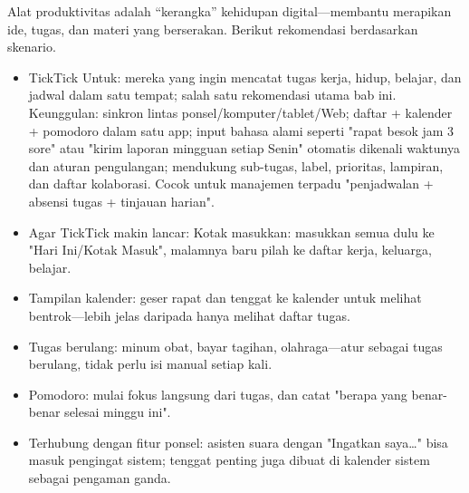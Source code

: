 


Alat produktivitas adalah “kerangka” kehidupan digital—membantu merapikan ide, tugas, dan materi yang berserakan. Berikut rekomendasi berdasarkan skenario.


\begin{itemize}
  \item TickTick Untuk: mereka yang ingin mencatat tugas kerja, hidup, belajar, dan jadwal dalam satu tempat; salah satu rekomendasi utama bab ini. Keunggulan: sinkron lintas ponsel/komputer/tablet/Web; daftar + kalender + pomodoro dalam satu app; input bahasa alami seperti "rapat besok jam 3 sore" atau "kirim laporan mingguan setiap Senin" otomatis dikenali waktunya dan aturan pengulangan; mendukung sub-tugas, label, prioritas, lampiran, dan daftar kolaborasi. Cocok untuk manajemen terpadu "penjadwalan + absensi tugas + tinjauan harian".
  \item Agar TickTick makin lancar: Kotak masukkan: masukkan semua dulu ke "Hari Ini/Kotak Masuk", malamnya baru pilah ke daftar kerja, keluarga, belajar.
  \item Tampilan kalender: geser rapat dan tenggat ke kalender untuk melihat bentrok—lebih jelas daripada hanya melihat daftar tugas.
  \item Tugas berulang: minum obat, bayar tagihan, olahraga—atur sebagai tugas berulang, tidak perlu isi manual setiap kali.
  \item Pomodoro: mulai fokus langsung dari tugas, dan catat "berapa yang benar-benar selesai minggu ini".
  \item Terhubung dengan fitur ponsel: asisten suara dengan "Ingatkan saya…" bisa masuk pengingat sistem; tenggat penting juga dibuat di kalender sistem sebagai pengaman ganda.
\end{itemize}

